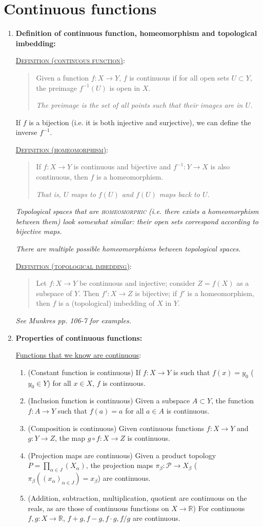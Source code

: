 \documentclass[letterpaper, 12pt]{article}
\newcommand{\RR}{\mathbb{R}}
\newcommand{\ms}[1]{\mathscr{#1}}
\newcommand{\defn}[2]{\textsc{\underline{Definition (#1)}:}\begin{quote} #2\end{quote}}
\begin{document}
\section{Continuous functions}
    \begin{enumerate}[resume]
    \item \textbf{Definition of continuous function, homeomorphism and topological imbedding:}

    \defn{continuous function}{Given a function $f:X\to Y$, $f$ is continuous if for all open sets $U\subset Y$, the preimage $f^{-1}(U)$ is open in $X$.

    \textit{The preimage is the set of all points such that their images are in $U$.}}

    If $f$ is a bijection (i.e. it is both injective and surjective), we can define the inverse $f^{-1}$.

    \defn{homeomorphism}{If $f:X\to Y$ is continuous and bijective and $f^{-1}:Y\to X$ is also continuous, then $f$ is a homeomorphism.

    \textit{That is, $U$ maps to $f(U)$ and $f(U)$ maps back to $U$.}}

    \textit{Topological spaces that are \textsc{homeomorphic} (i.e. there exists a homeomorphism between them) look somewhat similar: their open sets correspond according to bijective maps.}

    \textit{There are multiple possible homeomorphisms between topological spaces.}

    \defn{topological imbedding}{Let $f:X\to Y$ be continuous and injective; consider $Z=f(X)$ as a subspace of $Y$. Then $f':X\to Z$ is bijective; if $f'$ is a homeomorphism, then $f$ is a (topological) imbedding of $X$ in $Y$.}

    \textit{See Munkres pp. 106-7 for examples.}
    \item \textbf{Properties of continuous functions:}

    \underline{Functions that we know are continuous}:
    \begin{enumerate}
    \item (Constant function is continuous) If $f:X\to Y$ is such that $f(x) = y_0$ ($y_0\in Y$) for all $x\in X$, $f$ is continuous.
    \item (Inclusion function is continuous) Given a subspace $A\subset Y$, the function $f:A\to Y$ such that $f(a) = a$ for all $a\in A$ is continuous.
    \item (Composition is continuous) Given continuous functions $f:X\to Y$ and $g:Y\to Z$, the map $g\circ f : X\to Z$ is continuous.
    \item (Projection maps are continuous) Given a product topology $P = \prod_{\alpha\in J}(X_\alpha)$, the projection maps $\pi_\beta : \ms{P} \to X_\beta$ ($\pi_\beta((x_\alpha)_{\alpha\in J}) = x_\beta$) are continuous.
    \item (Addition, subtraction, multiplication, quotient are continuous on the reals, as are those of continuous functions on $X\to \RR$) For continuous $f,g:X\to\RR$, $f+g, f-g, f\cdot g, f/g$ are continuous.


\end{enumerate}
\end{enumerate}
\end{document}
